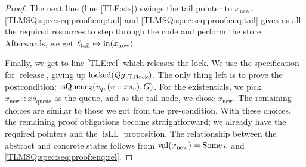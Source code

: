 \documentclass[a4paper, 10pt]{report}
\theoremstyle{definition}
\newcommand{\locked}{\operatorname{locked}}
\newcommand{\release}{\operatorname{release}}
\newcommand{\isqueueseq}{\operatorname{isQueue_{S}}}
\newcommand{\vq}{v_q}
\newcommand{\xsqueue}{xs_{\mathrm{queue}}}
\newcommand{\isLL}{\operatorname{isLL}}
\newcommand{\locN}[1]{\loc_{\mathrm{#1}}}
\newcommand{\loctail}{\locN{tail}}
\newcommand{\nIn}[1]{\operatorname{in}(#1)}
\newcommand{\nVal}[1]{\operatorname{val}(#1)}
\newcommand{\node}{x}
\newcommand{\nodeN}[1]{\node_{\mathrm{#1}}}
\newcommand{\nodenew}{\nodeN{new}}
\newcommand{\absvalue}{\val}
\newcommand{\absvalueList}{xs_v}
\newcommand{\Qg}{G}
\newcommand{\gtlock}{\gname_{\mathrm{Tlock}}}
\begin{document}
\begin{proof}
The next line (line \ref{TLE:sts}) swings the tail pointer to $\nodenew$. \ref{TLMSQ:spec:seq:proof:enq:tail} and \ref{TLMSQ:spec:seq:proof:enq:tail} gives us all the required resources to step through the code and perform the store. Afterwards, we get $\loctail \mapsto \nIn{\nodenew}$.

Finally, we get to line \ref{TLE:rel} which releases the lock. We use the specification for $\release$, giving up $\locked(Qg.\gtlock)$. The only thing left is to prove the postcondition: $\isqueueseq(\vq, (\absvalue :: \absvalueList), \Qg)$. For the existentials, we pick $\nodenew :: \xsqueue$ as the queue, and as the tail node, we chose $\nodenew$. The remaining choices are similar to those we got from the pre-condition. With these choices, the remaining proof obligations become straightforward; we already have the required pointers and the $\isLL$ proposition. The relationship between the abstract and concrete states follows from $\nVal{\nodenew} = \Some \absvalue$ and \ref{TLMSQ:spec:seq:proof:enq:rel}.
\end{proof}
\end{document}
